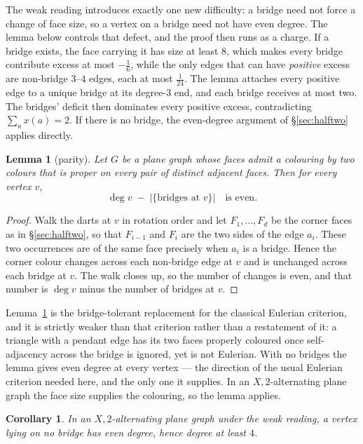 \documentclass[11pt,a4paper]{amsart}
\theoremstyle{plain}
\newtheorem{lemma}[theorem]{Lemma}
\newtheorem{corollary}[theorem]{Corollary}
\theoremstyle{definition}
\begin{document}
The weak reading introduces exactly one new difficulty: a bridge need not force
a change of face size, so a vertex on a bridge need not have even degree. The
lemma below controls that defect, and the proof then runs as a charge. If a
bridge exists, the face carrying it has size at least $8$, which makes every
bridge contribute excess at most $-\tfrac16$, while the only edges that can have
\emph{positive} excess are non-bridge $3$--$4$ edges, each at most
$\tfrac1{24}$. The lemma attaches every positive edge to a unique bridge at its
degree-$3$ end, and each bridge receives at most two. The bridges' deficit then
dominates every positive excess, contradicting $\sum_a x(a) = 2$. If there is no
bridge, the even-degree argument of \S\ref{sec:halftwo} applies directly.

\begin{lemma}[parity]\label{lem:parity}
Let $G$ be a plane graph whose faces admit a colouring by two colours that is
proper on every pair of distinct adjacent faces. Then for every vertex $v$,
\[
  \deg v \;-\; \bigl|\{\text{bridges at } v\}\bigr| \quad\text{is even.}
\]
\end{lemma}

\begin{proof}
Walk the darts at $v$ in rotation order and let $F_1,\dots,F_d$ be the corner
faces as in \S\ref{sec:halftwo}, so that $F_{i-1}$ and $F_i$ are the two sides
of the edge $a_i$. These two occurrences are of the same face precisely when
$a_i$ is a bridge. Hence the corner colour changes across each non-bridge edge
at $v$ and is unchanged across each bridge at $v$. The walk closes up, so the
number of changes is even, and that number is $\deg v$ minus the number of
bridges at $v$.
\end{proof}

Lemma~\ref{lem:parity} is the bridge-tolerant replacement for the classical
Eulerian criterion, and it is strictly weaker than that criterion rather than a
restatement of it: a triangle with a pendant edge has its two faces properly
coloured once self-adjacency across the bridge is ignored, yet is not Eulerian.
With no bridges the lemma gives even degree at every vertex --- the direction
of the usual Eulerian criterion needed here, and the only one it supplies. In an $X,2$-alternating plane graph the face
size supplies the colouring, so the lemma applies.

\begin{corollary}\label{cor:evendeg}
In an $X,2$-alternating plane graph under the weak reading, a vertex lying on no
bridge has even degree, hence degree at least $4$.
\end{corollary}
\end{document}
